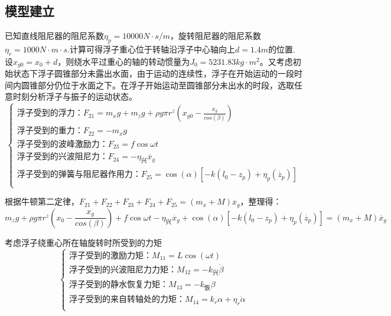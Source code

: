 \documentclass{article}
\numberwithin{equation}{subsection}
\begin{document}
\subsection{模型建立}
已知直线阻尼器的阻尼系数$\eta _{p}=10000 N·s/m$，旋转阻尼器的阻尼系数$\eta_r=1000 N·m·s$.计算可得浮子重心位于转轴沿浮子中心轴向上$d=1.4m$的位置.设$x_{g0}=x_0+d$，则绕水平过重心的轴的转动惯量为$J_0=5231.83 kg·m^2$。又考虑初始状态下浮子圆锥部分未露出水面，由于运动的连续性，浮子在开始运动的一段时间内圆锥部分仍位于水面之下。在浮子开始运动至圆锥部分未出水的时段，选取任意时刻分析浮子与振子的运动状态。
\begin{equation}
\left\{\begin{array}{l}
   \text{浮子受到的浮力：}F_{21}=m_{x} g +m_{z} g+\rho g \pi r^{z}\left(x_{g0}-\frac{x_g}{cos(\beta)}\right)\\
   \text{浮子受到的重力：}F_{22}=-m_{x} g\\
   \text{浮子受到的波峰激励力：}F_{23}=f \cos \omega t\\
   \text{浮子受到的兴波阻尼力：}F_{24}=-\eta_{\text{兴}} \dot{x_g}\\
   \text{浮子受到的弹簧与阻尼器作用力：}F_{25}=\cos(\alpha)[-k\left(l_{0}-z_p\right)+\eta_{p}(\dot{z_p})]\\
\end{array}\right.
\end{equation}

根据牛顿第二定律，$F_{21}+F_{22}+F_{23}+F_{24}+F_{25}=(m_x+M)\ddot{x_g}$，整理得：
\begin{equation}
m_{z} g+\rho g \pi r^{z}\left(x_{0}-\frac{x_g}{cos(\beta)}\right)+f \cos \omega t-\eta_{\text{兴}} \dot{x_g}+\cos(\alpha)[-k\left(l_{0}-z_p\right)+\eta_{p}(\dot{z_p})]=\left(m_{x}+M\right) \ddot{x_g}
\end{equation}


考虑浮子绕重心所在轴旋转时所受到的力矩
\begin{equation}
    \left\{\begin{array}{l}
        \text{浮子受到的激励力矩：}M_{11}=L\cos(\omega t)\\
        \text{浮子受到的兴波阻尼力力矩：}M_{12}=-k_{兴}\dot{\beta}\\
        \text{浮子受到的静水恢复力矩：}M_{13}=-k_{恢}\beta\\
        \text{浮子受到的来自转轴处的力矩：}M_{14}=k_r\alpha+\eta_r\dot{\alpha}\\
    \end{array}\right.
    \end{equation}
\end{document}
